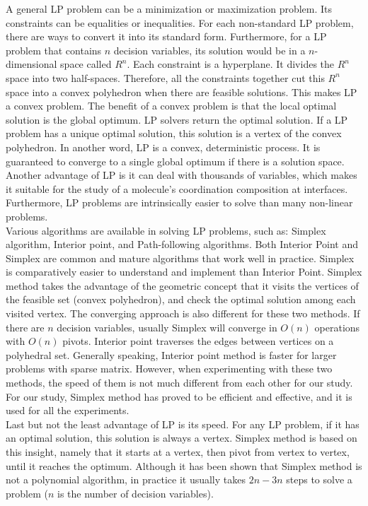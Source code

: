 A general LP problem can be a minimization or maximization problem. Its constraints can be equalities or inequalities. For each non-standard LP problem, there are ways to convert it into its standard form. Furthermore, for a LP problem that contains $n$ decision variables, its solution would be in a $n$-dimensional space called $R^{n}$. Each constraint is a hyperplane. It divides the $R^{n}$ space into two half-spaces. Therefore, all the constraints together cut this $R^{n}$ space into a convex polyhedron when there are feasible solutions. This makes LP a convex problem. The benefit of a convex problem is that the local optimal solution is the global optimum. LP solvers return the optimal solution. If a LP problem has a unique optimal solution, this solution is a vertex of the convex polyhedron. In another word, LP is a convex, deterministic process. It is guaranteed to converge to a single global optimum if there is a solution space. \\

Another advantage of LP is it can deal with thousands of variables, which makes it suitable for the study of a molecule's coordination composition at interfaces. Furthermore, LP problems are intrinsically easier to solve than many non-linear problems. \\

Various algorithms are available in solving LP problems, such as: Simplex algorithm, Interior point, and Path-following algorithms. Both Interior Point and Simplex are common and mature algorithms that work well in practice. Simplex is comparatively easier to understand and implement than Interior Point. Simplex method takes the advantage of the geometric concept that it visits the vertices of the feasible set (convex polyhedron), and check the optimal solution among each visited vertex. The converging approach is also different for these two methods. If there are $n$ decision variables, usually Simplex will converge in $O(n)$ operations with $O(n)$ pivots. Interior point traverses the edges between vertices on a polyhedral set. Generally speaking, Interior point method is faster for larger problems with sparse matrix. However, when experimenting with these two methods, the speed of them is not much different from each other for our study. For our study, Simplex method has proved to be efficient and effective, and it is used for all the experiments. \\

Last but not the least advantage of LP is its speed. For any LP problem, if it has an optimal solution, this solution is always a vertex. Simplex method is based on this insight, namely that it starts at a vertex, then pivot from vertex to vertex, until it reaches the optimum. Although it has been shown that Simplex method is not a polynomial algorithm, in practice it usually takes $2n-3n$ steps to solve a problem ($n$ is the number of decision variables). \\


